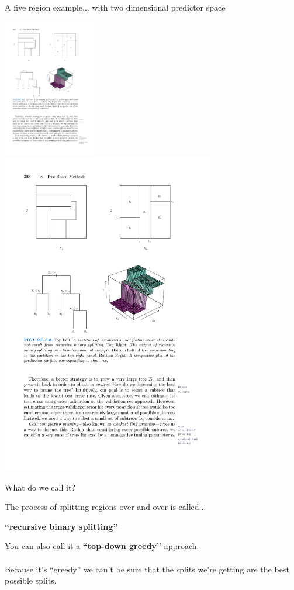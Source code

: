 \documentclass[mathserif, aspectratio=169]{beamer}
\begin{document}
\begin{frame}{A five region example... with two dimensional predictor space}

\includegraphics[width=0.3\textwidth]{five_region_ex_map}
\includegraphics[width=0.7\textwidth]{five_region_ex}
\end{frame}

\begin{frame}{What do we call it?}

The process of splitting regions over and over is called...

\begin{center}
\textbf{``recursive binary splitting''}
\end{center}

You can also call it a \textbf{``top-down greedy'}' approach.  \\~\\

Because it's ``greedy'' we can't be sure that the splits we're getting are the best possible splits.  

\end{frame}
\end{document}
